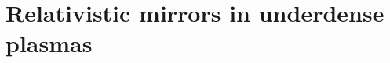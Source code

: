 \documentclass[10pt, a4paper, twoside, openright]{report}
\begin{document}
%

%

%



%


\section{Relativistic mirrors in underdense plasmas\label{sec:rfm}}
%

%

%

%
\end{document}
